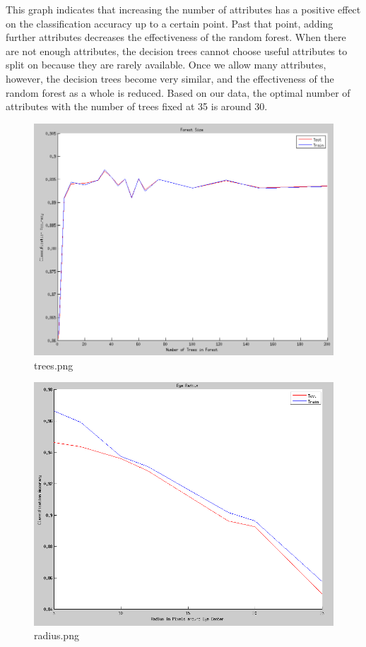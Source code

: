 \documentclass[11pt, twocolumn]{article}
\begin{document}
This graph indicates that increasing the number of attributes has a positive effect on the
classification accuracy up to a certain point. Past that point, adding further attributes decreases
the effectiveness of the random forest. When there are not enough attributes, the decision trees
cannot choose useful attributes to split on because they are rarely available. Once we allow many
attributes, however, the decision trees become very similar, and the effectiveness of the random
forest as a whole is reduced. Based on our data, the optimal number of attributes with the number of
trees fixed at 35 is around 30.



\begin{figure}[h!]
    \centering
    \includegraphics[scale=0.3]{./imgs/trees.png}
    \caption{
        trees.png
    }
\end{figure}

\begin{figure}[h!]
    \centering
    \includegraphics[scale=0.3]{./imgs/radius.png}
    \caption{
        radius.png
    }
\end{figure}
\end{document}
